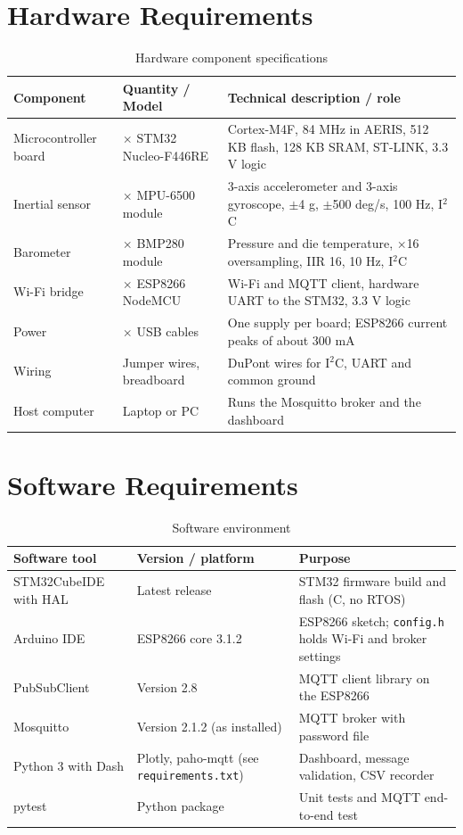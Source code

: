 \documentclass[12pt,a4paper]{report}
\begin{document}
\section{Hardware Requirements}
\begin{table}[htbp]
\centering
\caption{Hardware component specifications}
\label{tab:hw}
\small
\begin{tabularx}{\textwidth}{>{\raggedright\arraybackslash}p{3cm}>{\raggedright\arraybackslash}p{3cm}X}
\toprule
\textbf{Component} & \textbf{Quantity / Model} & \textbf{Technical description / role}\\
\midrule
Microcontroller board & 1 $\times$ STM32 Nucleo-F446RE & Cortex-M4F, 84 MHz in AERIS, 512 KB flash, 128 KB SRAM, ST-LINK, 3.3 V logic\\
Inertial sensor & 1 $\times$ MPU-6500 module & 3-axis accelerometer and 3-axis gyroscope, $\pm$4 g, $\pm$500 deg/s, 100 Hz, I$^2$C\\
Barometer & 1 $\times$ BMP280 module & Pressure and die temperature, $\times$16 oversampling, IIR 16, 10 Hz, I$^2$C\\
Wi-Fi bridge & 1 $\times$ ESP8266 NodeMCU & Wi-Fi and MQTT client, hardware UART to the STM32, 3.3 V logic\\
Power & 2 $\times$ USB cables & One supply per board; ESP8266 current peaks of about 300 mA\\
Wiring & Jumper wires, breadboard & DuPont wires for I$^2$C, UART and common ground\\
Host computer & Laptop or PC & Runs the Mosquitto broker and the dashboard\\
\bottomrule
\end{tabularx}
\end{table}

\section{Software Requirements}
\begin{table}[htbp]
\centering
\caption{Software environment}
\label{tab:sw}
\small
\begin{tabularx}{\textwidth}{>{\raggedright\arraybackslash}p{3.4cm}>{\raggedright\arraybackslash}p{3.8cm}X}
\toprule
\textbf{Software tool} & \textbf{Version / platform} & \textbf{Purpose}\\
\midrule
STM32CubeIDE with HAL & Latest release & STM32 firmware build and flash (C, no RTOS)\\
Arduino IDE & ESP8266 core 3.1.2 & ESP8266 sketch; \texttt{config.h} holds Wi-Fi and broker settings\\
PubSubClient & Version 2.8 & MQTT client library on the ESP8266\\
Mosquitto & Version 2.1.2 (as installed) & MQTT broker with password file\\
Python 3 with Dash & Plotly, paho-mqtt (see \texttt{requirements.txt}) & Dashboard, message validation, CSV recorder\\
pytest & Python package & Unit tests and MQTT end-to-end test\\
\bottomrule
\end{tabularx}
\end{table}
\end{document}
